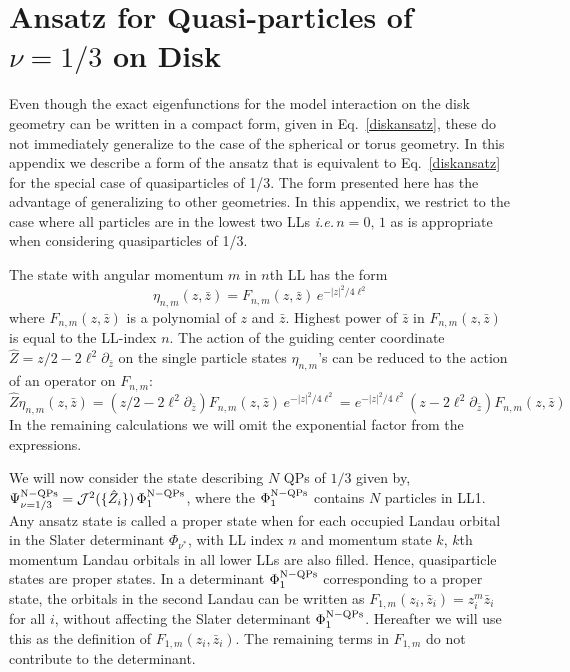 \documentclass[prb,aps,epsfig,longbibliography,twocolumn]{revtex4-1}
\newcommand{\ie}{\emph{i.e.}\,}
\newcommand{\rbkt}[1]{\left( #1\right)}
\begin{document}
\section{Ansatz for Quasi-particles of $\nu=1/3$ on Disk} \label{Ansatz1by3QPDisc}
Even though the exact eigenfunctions for the model interaction on the disk geometry can be written in a compact form, given in Eq.~\eqref{diskansatz}, these do not immediately generalize to the case of the spherical or torus geometry. In this appendix we describe a form of the ansatz that is equivalent to Eq.~\eqref{diskansatz} for the special case of quasiparticles of 1/3. The form presented here has the advantage of generalizing to other geometries. In this appendix, we restrict to the case where all particles are in the lowest two LLs \ie $n=0,\,1$ as is appropriate when considering quasiparticles of 1/3.

The state with angular momentum $m$ in $n$th LL has the form
\begin{equation}
	\eta_{n,m}(z,\bar{z})=F_{n,m}(z,\bar{z})\,e^{-|z|^2/4\ell^2}
\end{equation}
where $F_{n,m}(z,\bar{z})$ is a polynomial of $z$ and $\bar{z}$. Highest power of $\bar{z}$ in $F_{n,m}(z,\bar{z})$ is equal to the LL-index $n$. 
The action of the guiding center coordinate $\hat{Z}=z/2-2\ell^2\partial_{\bar{z}}$ on the single particle states $\eta_{n,m}$'s can be reduced to the action of an operator on $F_{n,m}$:
\begin{equation}
\hat{Z}\eta_{n,m}(z,\bar{z})= \rbkt{z/2-2\ell^2\partial_{\bar{z}}} F_{n,m}(z,\bar{z})\,e^{-|z|^2/4\ell^2} =e^{-|z|^2/4\ell^2} \rbkt{z-2\ell^2\partial_{\bar{z}}} F_{n,m}(z,\bar{z})
\end{equation}
In the remaining calculations we will omit the exponential factor from the expressions.

We will now consider the state describing $N$ QPs of $1/3$ given by, $\Psi^{\rm N-QPs}_{\nu=1/3} =  \mathcal{J}^{2}(\{ \hat{Z}_i \})\,\Phi^{\rm N-QPs}_{1} $, where the $\Phi^{\rm N-QPs}_{1}$ contains $N$ particles in LL1.  Any ansatz state is called a proper state when for each occupied Landau orbital in the Slater determinant $\Phi_{\nu^*}$, with LL index $n$ and momentum state $k$, $k$th momentum Landau orbitals in all lower LLs are also filled.\cite{Pu2017} Hence, quasiparticle states are proper states. In a determinant $\Phi^{\rm N-QPs}_{1}$ corresponding to a proper state, the orbitals in the second Landau can be written as $F_{1,m}(z_i,\bar{z}_i)=z_i^m\bar{z}_i$ for all $\textit{i}$, without affecting the Slater determinant $\Phi^{\rm N-QPs}_{1}$. Hereafter we will use this as the definition of $F_{1,m}(z_i,\bar{z}_i)$. The remaining terms in $F_{1,m}$ do not contribute to the determinant.
\end{document}
